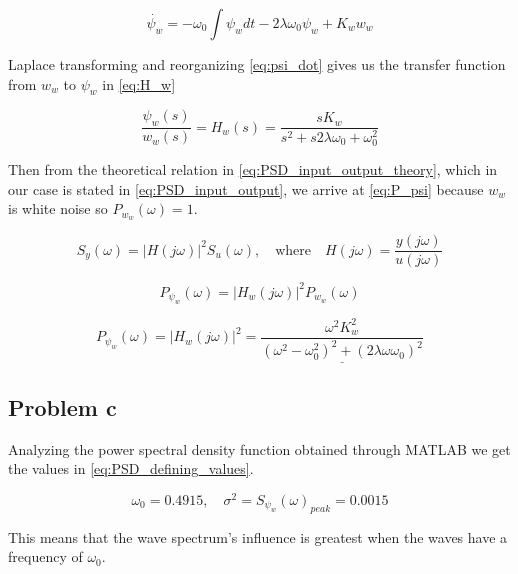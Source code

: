 \begin{equation} \label{eq:psi_dot}
    \dot{\psi_w} = - \omega_0  \int \psi_w dt - 2 \lambda \omega_0 \psi_w + K_w w_w
\end{equation}

Laplace transforming and reorganizing \cref{eq:psi_dot} gives us the transfer function from $w_w$ to $\psi_w$ in \cref{eq:H_w}

\begin{equation} \label{eq:H_w}
    \frac{\psi_w(s)}{w_w(s)} = H_w(s) = \frac{s K_w}{s^2 + s 2 \lambda \omega_0 + \omega_0^2}
\end{equation}


Then from the theoretical relation in \cref{eq:PSD_input_output_theory}, which in our case is stated in \cref{eq:PSD_input_output}, we arrive at \cref{eq:P_psi} because $w_w$ is white noise so $P_{w_w}(\omega) = 1$. 

\begin{equation} \label{eq:PSD_input_output_theory}
    S_y(\omega) = |H(j \omega)|^2 S_u(\omega), 
    \quad \textrm{where} \quad
    H(j \omega) = \frac{y(j \omega)}{u(j \omega)}
\end{equation}



\begin{equation} \label{eq:PSD_input_output}
    P_{\psi_w}(\omega) = |H_w(j \omega)|^2 P_{w_w}(\omega)
\end{equation}



\begin{equation} \label{eq:P_psi}
    P_{\psi_w}(\omega) = |H_w(j \omega)|^2 = \underline{\frac{\omega^2 K_w^2}{(\omega^2-\omega_0^2)^2 +(2\lambda \omega \omega_0)^2}}
\end{equation}

\subsection{Problem c}

Analyzing the power spectral density function obtained through MATLAB we get the values in \cref{eq:PSD_defining_values}.

\begin{equation} \label{eq:PSD_defining_values}
    \omega_0 = 0.4915 %
    , \quad \sigma^2 = S_{\psi_w}(\omega)_{peak} = 0.0015 
\end{equation}

This means that the wave spectrum's influence is greatest when the waves have a frequency of $\omega_0$.




